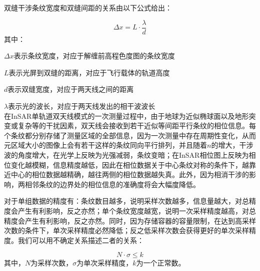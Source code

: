 \documentclass[a4paper]{article}
\begin{document}
	双缝干涉条纹宽度和双缝间距的关系由以下公式给出：\par
	\begin{equation}
		\Delta x = L \cdot \frac{\lambda}{d}
	\end{equation}
	其中：\par
	$ \Delta x $表示条纹宽度，对应于解缠前高程色度图的条纹宽度\par
	$ L $表示光屏到双缝的距离，对应于飞行载体的轨道高度\par
	$ d $表示双缝宽度，对应于两天线之间的距离\par
	$ \lambda $表示光的波长，对应于两天线发出的相干波波长\\

	在InSAR单轨道双天线模式的一次测量过程中，由于地球为近似椭球面以及地形突变或复杂等的干扰因素，双天线会接收到若干近似等间距平行条纹的相位信息。每个条纹都分别存储了测量区域的全部信息，因为一次测量中存在周期性变化，从而元区域大小的图像上会有若干这样的条纹同向平行排列，并且随着$ n $的增大，干涉波的角度增大，在光学上反映为光强减弱，条纹变暗；在InSAR相位图上反映为相位变化越模糊，信息精度越低，因此在相位数据关于中心条纹对称的条件下，越靠近中心的相位数据越精确，越往两侧的相位数据越失真。此外，因为相消干涉的影响，两相邻条纹的边界处的相位信息的准确度将会大幅度降低。\par
	对于单组数据的精度有：条纹数目越多，说明采样次数越多，信息量越大，对总精度会产生有利影响，反之亦然；单个条纹宽度越宽，说明一次采样精度越高，对总精度会产生有利影响，反之亦然。同时，因为存储容器的容量限制，在达到高采样次数的条件下，单次采样精度必然降低；反之低采样次数会获得更好的单次采样精度。我们可以用不确定关系描述二者的关系：\par
	\begin{equation}
		N \cdot \sigma \leq k
	\end{equation}	
	其中，$ N $为采样次数，$ \sigma $为单次采样精度，$ k $为一个正常数。
	
\end{document}
